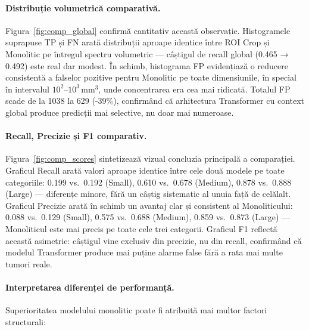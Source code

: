 \documentclass[12pt, a4paper]{report}
\begin{document}
\paragraph{Distribuție volumetrică comparativă.}
Figura~\ref{fig:comp_global} confirmă cantitativ această observație. Histogramele suprapuse TP și FN arată distribuții aproape identice între ROI Crop și Monolitic pe întregul spectru volumetric — câștigul de recall global (0.465 → 0.492) este real dar modest. În schimb, histograma FP evidențiază o reducere consistentă a falselor pozitive pentru Monolitic pe toate dimensiunile, în special în intervalul $10^2$–$10^3$\,mm$^3$, unde concentrarea era cea mai ridicată. Totalul FP scade de la 1038 la 629 (-39\%), confirmând că arhitectura Transformer cu context global produce predicții mai selective, nu doar mai numeroase.

\paragraph{Recall, Precizie și F1 comparativ.}
Figura~\ref{fig:comp_scores} sintetizează vizual concluzia principală a comparației. Graficul Recall arată valori aproape identice între cele două modele pe toate categoriile: 0.199 vs.\ 0.192 (Small), 0.610 vs.\ 0.678 (Medium), 0.878 vs.\ 0.888 (Large) — diferențe minore, fără un câștig sistematic al unuia față de celălalt. Graficul Precizie arată în schimb un avantaj clar și consistent al Monoliticului: 0.088 vs.\ 0.129 (Small), 0.575 vs.\ 0.688 (Medium), 0.859 vs.\ 0.873 (Large) — Monoliticul este mai precis pe toate cele trei categorii. Graficul F1 reflectă această asimetrie: câștigul vine exclusiv din precizie, nu din recall, confirmând că modelul Transformer produce mai puține alarme false fără a rata mai multe tumori reale.

\paragraph{Interpretarea diferenței de performanță.}
Superioritatea modelului monolitic poate fi atribuită mai multor factori structurali:
\end{document}

